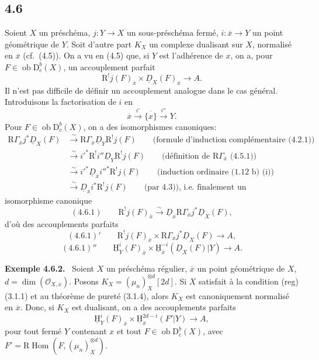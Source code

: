 \documentclass[11pt]{article}
\providecommand{\cO}{\mathcal{O}}
\providecommand{\uH}{\underline{\mathrm H}}
\newenvironment{statement}[1]{\par\medskip\noindent\textbf{#1.}\ }{\par\medskip}
\DeclareMathOperator{\Hom}{Hom}
\newcommand{\R}{\mathrm{R}}
\newcommand{\D}{\mathrm{D}}
\newcommand{\ob}{\operatorname{ob}}
\newcommand{\ol}[1]{\overline{#1}}
\providecommand{\Hom}{\operatorname{Hom}}
\providecommand{\ob}{\operatorname{ob}}
\providecommand{\R}{\mathrm R}
\providecommand{\Hom}{\operatorname{Hom}}
\begin{document}
\subsection*{4.6}
Soient $X$ un préschéma, $j:Y\to X$ un sous-préschéma fermé, $i:\ol{x}\to Y$ un point géométrique de $Y$. Soit d'autre part $K_X$ un complexe dualisant sur $X$, normalisé en $\ol{x}$ (cf.~(4.5)). On a vu en (4.5) que, si $Y$ est l'adhérence de $x$, on a, pour $F\in\ob\D_c^b(X)$, un accouplement parfait
\[
\R^{!}j(F)_{\ol{x}}\times \underline{D}_X(F)_{\ol{x}}\longrightarrow A.
\]
Il n'est pas difficile de définir un accouplement analogue dans le cas général. Introduisons la factorisation de $i$ en
\[
\ol{x}\xrightarrow{i'}\ol{\{x\}}\xrightarrow{i''}Y.
\]
Pour $F\in\ob\D_c^b(X)$, on a des isomorphismes canoniques:
\[
\begin{aligned}
\R\Gamma_{\ol{x}}j^*\underline{D}_X(F)&\xrightarrow{\sim}\R\Gamma_{\ol{x}}\underline{D}_Y\R^{!}j(F)\qquad\text{(formule d'induction complémentaire (4.2.1))}\\
&\xrightarrow{\sim}i'^*\R^{!}i''\underline{D}_Y\R^{!}j(F)\qquad\text{(définition de $\R\Gamma_{\ol{x}}$ (4.5.1))}\\
&\xrightarrow{\sim}i'^*\underline{D}_{\ol{x}}i''^*\R^{!}j(F)\qquad\text{(induction ordinaire (1.12 b) (i))}\\
&\xrightarrow{\sim}\underline{D}_{\ol{x}}i^*\R^{!}j(F)\qquad\text{(par 4.3)), i.e. finalement un}
\end{aligned}
\]
isomorphisme canonique
\[
(4.6.1)\qquad \R^{!}j(F)_{\ol{x}}\xrightarrow{\sim}\underline{D}_{\ol{x}}\R\Gamma_{\ol{x}}j^*\underline{D}_X(F),
\]
d'où des accouplements parfaits
\[
(4.6.1)'\qquad \R^{!}j(F)_{\ol{x}}\times \R\Gamma_{\ol{x}}j^*\underline{D}_X(F)\longrightarrow A,
\]
\[
(4.6.1)''\qquad \uH_Y^i(F)_{\ol{x}}\times \uH_{\ol{x}}^{-i}(\underline{D}_X(F)|Y)\longrightarrow A.
\]

\begin{statement}{Exemple 4.6.2}
Soient $X$ un préschéma régulier, $\ol{x}$ un point géométrique de $X$, $d=\dim(\cO_{X,\ol{x}})$. Posons $K_X=(\mu_n)_X^{\otimes d}[2d]$. Si $X$ satisfait à la condition (reg) (3.1.1) et au théorème de pureté (3.1.4), alors $K_X$ est canoniquement normalisé en $\ol{x}$. Donc, si $K_X$ est dualisant, on a des accouplements parfaits
\[
\uH_Y^i(F)_{\ol{x}}\times \uH_{\ol{x}}^{2d-i}(F'|Y)\longrightarrow A,
\]
pour tout fermé $Y$ contenant $x$ et tout $F\in\ob\D_c^b(X)$, avec $F'=\R\Hom(F,(\mu_n)_X^{\otimes d})$.
\end{statement}
\end{document}
